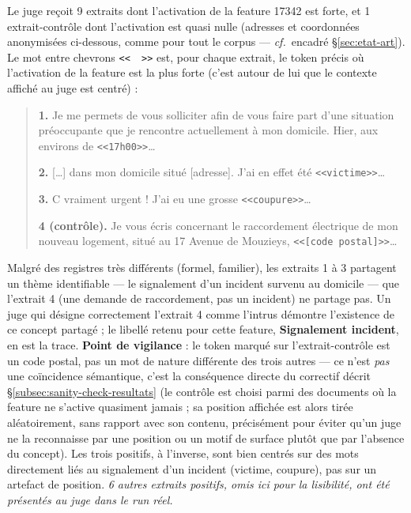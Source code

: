 \documentclass[11pt]{article}
\begin{document}
\begin{resourcebox}
\label{box:feature17342}
Le juge reçoit 9 extraits dont l'activation de la feature 17342 est forte, et
1 extrait-contrôle dont l'activation est quasi nulle (adresses et coordonnées
anonymisées ci-dessous, comme pour tout le corpus --- \emph{cf.}~encadré
\S\ref{sec:etat-art}). Le mot entre chevrons \texttt{<<~~>>} est, pour chaque
extrait, le token précis où l'activation de la feature est la plus forte
(c'est autour de lui que le contexte affiché au juge est centré) :
\begin{quote}\small
\textbf{1.} \og{}Je me permets de vous solliciter afin de vous faire part
d'une situation préoccupante que je rencontre actuellement à mon domicile.
Hier, aux environs de \texttt{<<17h00>>}\ldots{}\fg{}

\textbf{2.} \og{}[\ldots] dans mon domicile situé [adresse]. J'ai en effet
été \texttt{<<victime>>}\ldots{}\fg{}

\textbf{3.} \og{}C vraiment urgent ! J'ai eu une grosse
\texttt{<<coupure>>}\ldots{}\fg{}

\textbf{4 (contrôle).} \og{}Je vous écris concernant le raccordement
électrique de mon nouveau logement, situé au 17 Avenue de Mouzieys,
\texttt{<<[code postal]>>}\ldots{}\fg{}
\end{quote}
Malgré des registres très différents (formel, familier), les extraits 1 à 3
partagent un thème identifiable --- le signalement d'un incident survenu au
domicile --- que l'extrait 4 (une demande de raccordement, pas un incident)
ne partage pas. Un juge qui désigne correctement l'extrait 4 comme l'intrus
démontre l'existence de ce concept partagé ; le libellé retenu pour cette
feature, \textbf{\og{}Signalement incident\fg{}}, en est la trace.
\textbf{Point de vigilance} : le token marqué sur l'extrait-contrôle est un
code postal, pas un mot de nature différente des trois autres --- ce n'est
\emph{pas} une coïncidence sémantique, c'est la conséquence directe du
correctif décrit \S\ref{subsec:sanity-check-resultats} (le contrôle est
choisi parmi des documents où la feature ne s'active quasiment jamais ; sa
position affichée est alors tirée aléatoirement, sans rapport avec son
contenu, précisément pour éviter qu'un juge ne la reconnaisse par une
position ou un motif de surface plutôt que par l'absence du concept). Les
trois positifs, à l'inverse, sont bien centrés sur des mots directement liés
au signalement d'un incident (\og{}victime\fg{}, \og{}coupure\fg{}), pas sur
un artefact de position. \emph{6 autres extraits positifs, omis ici pour la
lisibilité, ont été présentés au juge dans le run réel.}
\end{resourcebox}
\end{document}

